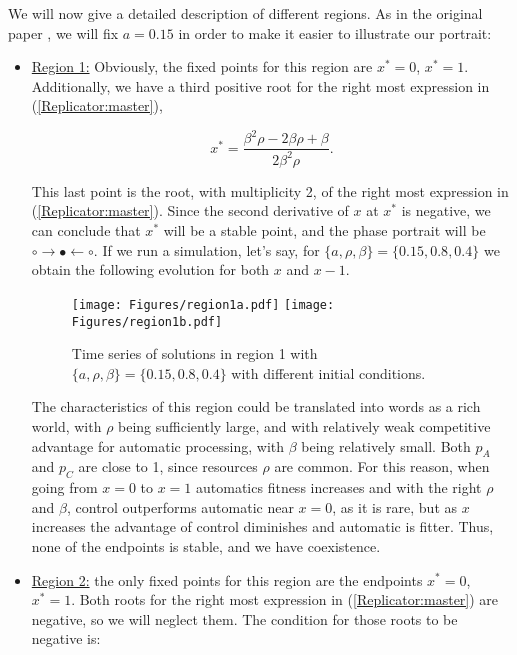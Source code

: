 \documentclass[10pt,a4paper]{article}
\begin{document}
We will now give a detailed description of different regions. As in the original 
paper \cite{Strogatz:evolutionary}, we will fix $a=0.15$ in order to make it easier to illustrate our portrait:

\begin{itemize}
 \item {\underline{Region 1:} Obviously, the fixed points for this region are $x^*=0$, $x^*=1$. Additionally, we have a third positive root for the right most expression in
       (\ref{Replicator:master}), 
       
 $$x^*=\frac{\beta^2 \rho -2\beta\rho+\beta}{2\beta^2 \rho}.$$
 
 This last point is the root, with multiplicity 2, of the right most expression in (\ref{Replicator:master}). Since the second derivative of $x$ at $x^*$ is negative, we can conclude that $x^*$ will be a stable 
 point, and the phase portrait will be $\circ\rightarrow\bullet\leftarrow\circ$. If we run a simulation, let's say, for $\{a,\rho,\beta\}=\{0.15,0.8,0.4\}$ we
 obtain the following evolution for both $x$ and $x-1$. 
 
\begin{figure}[h!]
\centering
\vspace{-1.5cm}
\texttt{[image: Figures/region1a.pdf]}
\texttt{[image: Figures/region1b.pdf]}
\vspace{-0.4cm}
\caption{Time series of solutions in region 1 with  $\{a,\rho,\beta\}=\{0.15,0.8,0.4\}$ with different initial conditions.}
\end{figure}
 
 The characteristics of this region could be translated into words as a rich world, with $\rho$ being sufficiently large, and with relatively weak competitive
 advantage for automatic processing, with $\beta$ being relatively small. Both $p_A$ and $p_C$ are close to 1, since resources $\rho$ are common. For this reason,
 when going from $x=0$ to $x=1$ automatics fitness increases and with the right $\rho$ and $\beta$, control outperforms automatic near $x=0$, as it is rare, but 
 as $x$ increases the advantage of control diminishes and automatic is fitter. Thus, none of the endpoints is stable, and we have coexistence.
 }
 \item {\underline{Region 2:} the only fixed points for this region are the endpoints $x^*=0$, $x^*=1$. Both roots for the right most expression in (\ref{Replicator:master})
	are negative, so we will neglect them. The condition for those roots to be negative is:
	
}
\end{itemize}
\end{document}
